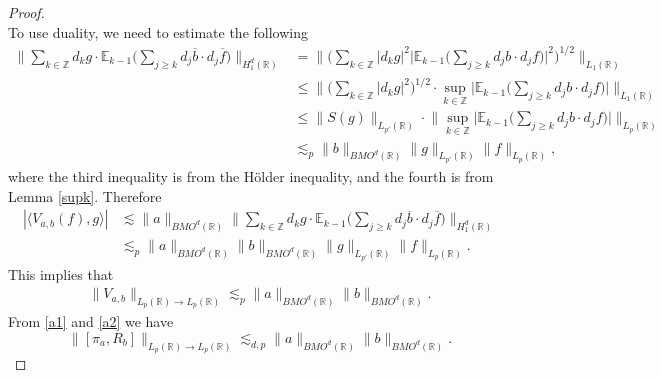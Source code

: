 \documentclass[oneside,english,a4wide]{amsart}
\numberwithin{equation}{section}
\numberwithin{figure}{section}
\theoremstyle{plain}
\theoremstyle{plain}
\theoremstyle{definition}
\theoremstyle{plain}
\theoremstyle{remark}
\theoremstyle{definition}
\theoremstyle{remark}
\theoremstyle{definition}
\newcommand{\8}{\infty}
\begin{document}
\begin{proof}
\begin{equation*}
	\end{equation*}
	To use duality, we need to estimate the following
	\begin{equation}\label{SV3}
		\begin{aligned}
			\biggl\|\sum_{k\in\mathbb{Z}}d_kg\cdot \mathbb{E}_{k-1}\biggl(\sum_{j\ge k}d_j\overline{b}\cdot d_j\overline{f}\biggr)\biggr\|_{H_1^d(\mathbb{R})}{}&=\biggl\|\biggl(\sum_{k\in\mathbb{Z}} |d_kg|^2\biggl|\mathbb{E}_{k-1}\biggl(\sum\limits_{j\ge k}d_j{b}\cdot d_j{f}\biggr)\biggr|^2\biggr)^{1/2}\biggr\|_{L_1(\mathbb{R})}\\
			&\le \biggl\|\biggl(\sum_{k\in\mathbb{Z}} |d_kg|^2\biggr)^{1/2} \cdot\sup_{k\in\mathbb{Z}}\biggl|\mathbb{E}_{k-1}\biggl(\sum\limits_{j\ge k}d_j{b}\cdot d_j{f}\biggr)\biggr|\biggr\|_{L_1(\mathbb{R})}\\
			&
			\le \|S(g)\|_{L_{p'}(\mathbb{R})}\cdot\biggl\|\sup_{k\in\mathbb{Z}}\biggl|\mathbb{E}_{k-1}\biggl(\sum\limits_{j\ge k}d_j{b}\cdot d_j{f}\biggr)\biggr|\biggr\|_{L_p(\mathbb{R})}\\
			&\lesssim_{p} \|b\|_{BMO^d(\mathbb{R})} \|g\|_{L_{p'}(\mathbb{R})}\|f\|_{L_p(\mathbb{R})},
		\end{aligned}
	\end{equation}
	where the third inequality is from the Hölder inequality, and the fourth is from Lemma \ref{supk}.
	Therefore 
	\begin{equation*}
		\begin{aligned}
			|\langle V_{a,b} (f),g\rangle|{}&\lesssim \|a\|_{BMO^d(\mathbb{R})}\biggl\|\sum_{k\in\mathbb{Z}}d_kg\cdot \mathbb{E}_{k-1}\biggl(\sum_{j\ge k}d_j\overline{b}\cdot d_j\overline{f}\biggr)\biggr\|_{H_1^d(\mathbb{R})}\\
			&\lesssim_{p} \|a\|_{BMO^d(\mathbb{R})}\|b\|_{BMO^d(\mathbb{R})} \|g\|_{L_{p'}(\mathbb{R})}\|f\|_{L_p(\mathbb{R})}.
		\end{aligned}
	\end{equation*}
	This implies that
	\begin{equation}\label{a2}
		\begin{aligned}
			\|V_{a,b}\|_{L_p(\mathbb{R})\to L_p(\mathbb{R})}\lesssim_{p} \|a\|_{BMO^d(\mathbb{R})}\|b\|_{BMO^d(\mathbb{R})}.
		\end{aligned}
	\end{equation}	
	From \eqref{a1} and \eqref{a2} we have
	\begin{equation*}
		\|[\pi_{a}, R_b]\|_{L_p(\mathbb{R})\to L_p(\mathbb{R})}\lesssim_{d,p} \|a\|_{BMO^d(\mathbb{R})}\|b\|_{BMO^d(\mathbb{R})}.
	\end{equation*}	

\end{proof}
\end{document}
